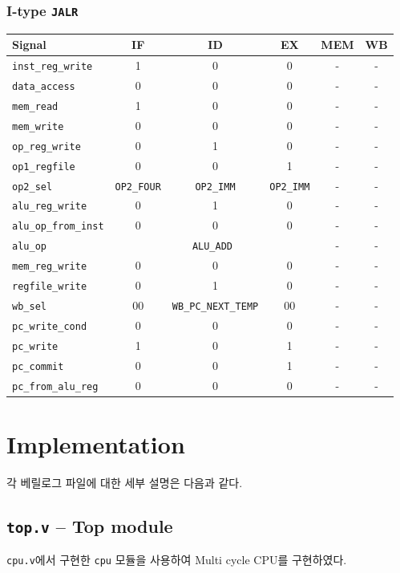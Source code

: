 \documentclass{scrartcl}
\begin{document}
\subsubsection{I-type \texttt{JALR}}
\begin{tabularx}{\textwidth}{ | X | c | c | c | c | c | }
  \hline
  \textbf{Signal} & \textbf{IF} & \textbf{ID} & \textbf{EX} & \textbf{MEM} & \textbf{WB} \\ \hline
  \texttt{inst\_reg\_write} & 1 & 0 & 0 & - & - \\ \hline
  \texttt{data\_access} & 0 & 0 & 0 & - & - \\ \hline
  \texttt{mem\_read} & 1 & 0 & 0 & - & - \\ \hline
  \texttt{mem\_write} & 0 & 0 & 0 & - & - \\ \hline
  \texttt{op\_reg\_write} & 0 & 1 & 0 & - & - \\ \hline
  \texttt{op1\_regfile} & 0 & 0 & 1 & - & - \\ \hline
  \texttt{op2\_sel} & \texttt{OP2\_FOUR} & \texttt{OP2\_IMM} & \texttt{OP2\_IMM} & - & - \\ \hline
  \texttt{alu\_reg\_write} & 0 & 1 & 0 & - & - \\ \hline
  \texttt{alu\_op\_from\_inst} & 0 & 0 & 0 & - & - \\ \hline
  \texttt{alu\_op} & \multicolumn{3}{c|}{\texttt{ALU\_ADD}} & - & - \\ \hline
  \texttt{mem\_reg\_write} & 0 & 0 & 0 & - & - \\ \hline
  \texttt{regfile\_write} & 0 & 1 & 0 & - & - \\ \hline
  \texttt{wb\_sel} & 00 & \texttt{WB\_PC\_NEXT\_TEMP} & 00 & - & - \\ \hline
  \texttt{pc\_write\_cond} & 0 & 0 & 0 & - & - \\ \hline
  \texttt{pc\_write} & 1 & 0 & 1 & - & - \\ \hline
  \texttt{pc\_commit} & 0 & 0 & 1 & - & - \\ \hline
  \texttt{pc\_from\_alu\_reg} & 0 & 0 & 0 & - & - \\ \hline
\end{tabularx}

\section{Implementation}
각 베릴로그 파일에 대한 세부 설명은 다음과 같다.

\subsection{\texttt{top.v} -- Top module}
\texttt{cpu.v}에서 구현한 \texttt{cpu} 모듈을 사용하여 Multi cycle CPU를 구현하였다.
\end{document}

